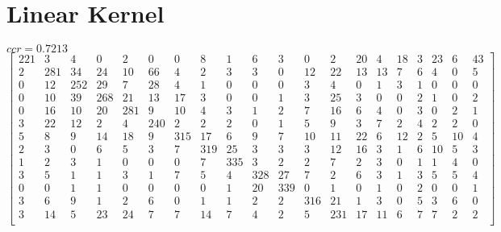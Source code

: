 \documentclass[a4paper, 11pt]{article}
\begin{document}
\section{Linear Kernel}
$ccr = 0.7213$
\[\begin{bmatrix}
221  &   3  &   4  &   0  &   2  &   0  &   0  &   8  &   1  &   6  &   3  &   0  &   2  &  20  &   4  &  18  &   3  &  23  &   6    & 43 \\
     2  & 281  &  34  &  24  &  10  &  66  &   4  &   2  &   3  &   3  &   0  &  12  &  22  &  13  &  13  &   7  &   6  &   4  &   0    &  5 \\
     0  &  12  & 252  &  29  &   7  &  28  &   4  &   1  &   0  &   0  &   0  &   3  &   4  &   0  &   1  &   3  &   1  &   0  &   0    &  0 \\
     0  &  10  &  39  & 268  &  21  &  13  &  17  &   3  &   0  &   0  &   1  &   3  &  25  &   3  &   0  &   0  &   2  &   1  &   0    &  2 \\
     0  &  16  &  10  &  20  & 281  &   9  &  10  &   4  &   3  &   1  &   2  &   7  &  16  &   6  &   4  &   0  &   3  &   0  &   2    &  1 \\
     3  &  22  &  12  &   2  &   4  & 240  &   2  &   2  &   2  &   0  &   1  &   5  &   9  &   3  &   7  &   2  &   4  &   2  &   2    &  0 \\
     5  &   8  &   9  &  14  &  18  &   9  & 315  &  17  &   6  &   9  &   7  &  10  &  11  &  22  &   6  &  12  &   2  &   5  &  10    &  4 \\
     2  &   3  &   0  &   6  &   5  &   3  &   7  & 319  &  25  &   3  &   3  &   3  &  12  &  16  &   3  &   1  &   6  &  10  &   5    &  3 \\
     1  &   2  &   3  &   1  &   0  &   0  &   0  &   7  & 335  &   3  &   2  &   2  &   7  &   2  &   3  &   0  &   1  &   1  &   4    &  0 \\
     3  &   5  &   1  &   1  &   3  &   1  &   7  &   5  &   4  & 328  &  27  &   7  &   2  &   6  &   3  &   1  &   3  &   5  &   5    &  4 \\
     0  &   0  &   1  &   1  &   0  &   0  &   0  &   0  &   1  &  20  & 339  &   0  &   1  &   0  &   1  &   0  &   2  &   0  &   0    &  1 \\
     3  &   6  &   9  &   1  &   2  &   6  &   0  &   1  &   1  &   2  &   2  & 316  &  21  &   1  &   3  &   0  &   5  &   3  &   6    &  0 \\
     3  &  14  &   5  &  23  &  24  &   7  &   7  &  14  &   7  &   4  &   2  &   5  & 231  &  17  &  11  &   6  &   7  &   7  &   2    &  2 \\

\end{bmatrix}\]
\end{document}
